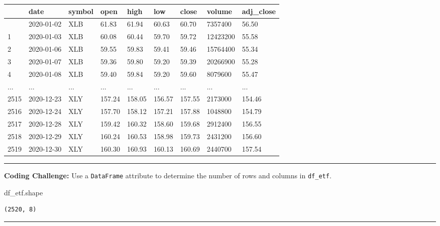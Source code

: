 \documentclass[
  letterpaper,
  DIV=11,
  numbers=noendperiod]{scrreprt}
\newenvironment{Shaded}{\begin{snugshade}}{\end{snugshade}}
\newcommand{\NormalTok}[1]{\textcolor[rgb]{0.00,0.23,0.31}{#1}}
\begin{document}
\begin{longtable}[]{@{}lllllllll@{}}
\toprule\noalign{}
& date & symbol & open & high & low & close & volume & adj\_close \\
\midrule\noalign{}
\endhead
\bottomrule\noalign{}
\endlastfoot
0 & 2020-01-02 & XLB & 61.83 & 61.94 & 60.63 & 60.70 & 7357400 &
56.50 \\
1 & 2020-01-03 & XLB & 60.08 & 60.44 & 59.70 & 59.72 & 12423200 &
55.58 \\
2 & 2020-01-06 & XLB & 59.55 & 59.83 & 59.41 & 59.46 & 15764400 &
55.34 \\
3 & 2020-01-07 & XLB & 59.36 & 59.80 & 59.20 & 59.39 & 20266900 &
55.28 \\
4 & 2020-01-08 & XLB & 59.40 & 59.84 & 59.20 & 59.60 & 8079600 &
55.47 \\
... & ... & ... & ... & ... & ... & ... & ... & ... \\
2515 & 2020-12-23 & XLY & 157.24 & 158.05 & 156.57 & 157.55 & 2173000 &
154.46 \\
2516 & 2020-12-24 & XLY & 157.70 & 158.12 & 157.21 & 157.88 & 1048800 &
154.79 \\
2517 & 2020-12-28 & XLY & 159.42 & 160.32 & 158.60 & 159.68 & 2912400 &
156.55 \\
2518 & 2020-12-29 & XLY & 160.24 & 160.53 & 158.98 & 159.73 & 2431200 &
156.60 \\
2519 & 2020-12-30 & XLY & 160.30 & 160.93 & 160.13 & 160.69 & 2440700 &
157.54 \\
\end{longtable}

\begin{center}\rule{0.5\linewidth}{0.5pt}\end{center}

\textbf{Coding Challenge:} Use a \texttt{DataFrame} attribute to
determine the number of rows and columns in \texttt{df\_etf}.

\begin{Shaded}
\begin{Highlighting}[]
\NormalTok{df\_etf.shape}
\end{Highlighting}
\end{Shaded}

\begin{verbatim}
(2520, 8)
\end{verbatim}

\begin{center}\rule{0.5\linewidth}{0.5pt}\end{center}
\end{document}
